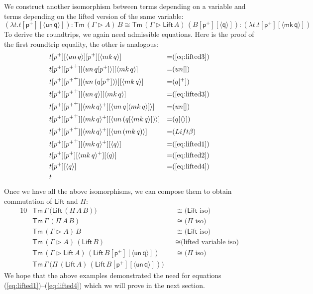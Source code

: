 \documentclass[a4paper,UKenglish,cleveref, autoref, thm-restate]{lipics-v2021}
\newcommand{\Tm}{\mathsf{Tm}}
\newcommand{\p}{\mathsf{p}}
\newcommand{\q}{\mathsf{q}}
\newcommand{\ext}{\mathop{\triangleright}}
\newcommand{\Lift}{\mathsf{Lift}}
\newcommand{\mk}{\mathsf{mk}}
\newcommand{\un}{\mathsf{un}}
\begin{document}
We construct another isomorphism between terms depending on a variable and
terms depending on the lifted version of the same variable:
\[
(\lambda t.t[\p^+][\langle\un\,\q\rangle]) : \Tm\,(\Gamma\ext A)\,B \cong \Tm\,(\Gamma\ext\Lift\,A)\,(B[\p^+][\langle\q\rangle]) : (\lambda t.t[\p^+][\langle\mk\,\q\rangle])
\]
To derive the roundtrips, we again need admissible equations. Here is
the proof of the first roundtrip equality, the other is analogous:
\begin{alignat*}{10}
  & t[\p^+][\langle\un\,\q\rangle][\p^+][\langle\mk\,\q\rangle] && {=}(\ref{eq:lifted3}) \\
  & t[\p^+][{\p^+}^+][\langle\un\,\q[\p^+]\rangle][\langle\mk\,\q\rangle] && {=}(\un[]) \\
  & t[\p^+][{\p^+}^+][\langle\un\,(\q[\p^+])\rangle][\langle\mk\,\q\rangle] && {=}(\q[^+]) \\
  & t[\p^+][{\p^+}^+][\langle\un\,\q\rangle][\langle\mk\,\q\rangle] && {=}(\ref{eq:lifted3}) \\
  & t[\p^+][{\p^+}^+][\langle\mk\,\q\rangle^+][\langle\un\,\q[\langle\mk\,\q\rangle]\rangle] && {=}(\un[]) \\
  & t[\p^+][{\p^+}^+][\langle\mk\,\q\rangle^+][\langle\un\,(\q[\langle\mk\,\q\rangle])\rangle] && {=}(\q[\langle\rangle]) \\
  & t[\p^+][{\p^+}^+][\langle\mk\,\q\rangle^+][\langle\un\,(\mk\,\q)\rangle] && {=}(\Lift\beta) \\
  & t[\p^+][{\p^+}^+][\langle\mk\,\q\rangle^+][\langle\q\rangle] && {=}(\ref{eq:lifted1}) \\
  & t[\p^+][\p^+][\langle\mk\,\q\rangle^+][\langle\q\rangle] && {=}(\ref{eq:lifted2}) \\
  & t[\p^+][\langle\q\rangle] && {=}(\ref{eq:lifted4}) \\
  & t
\end{alignat*}
Once we have all the above isomorphisms, we can compose them to obtain commutation of $\Lift$ and $\Pi$:
\begin{alignat*}{10}
  & \Tm\,\Gamma\,\big(\Lift\,(\Pi\,A\,B)\big) && {\cong}\text{($\Lift$ iso)} \\
  & \Tm\,\Gamma\,(\Pi\,A\,B) && {\cong}\text{($\Pi$ iso)} \\
  & \Tm\,(\Gamma\ext A)\,B && {\cong}\text{($\Lift$ iso)} \\
  & \Tm\,(\Gamma\ext A)\,(\Lift\,B) && {\cong}\text{(lifted variable iso)} \\
  & \Tm\,(\Gamma\ext \Lift\,A)\,(\Lift\,B[\p^+][\langle\un\,\q\rangle]) && {\cong}\text{($\Pi$ iso)} \\
  & \Tm\,\Gamma\,\big(\Pi\,(\Lift\,A)\,(\Lift\,B[\p^+][\langle\un\,\q\rangle])\big)
\end{alignat*}
We hope that the above examples demonstrated the need for equations
(\ref{eq:lifted1})--(\ref{eq:lifted4}) which we will prove in the next
section.
\end{document}
